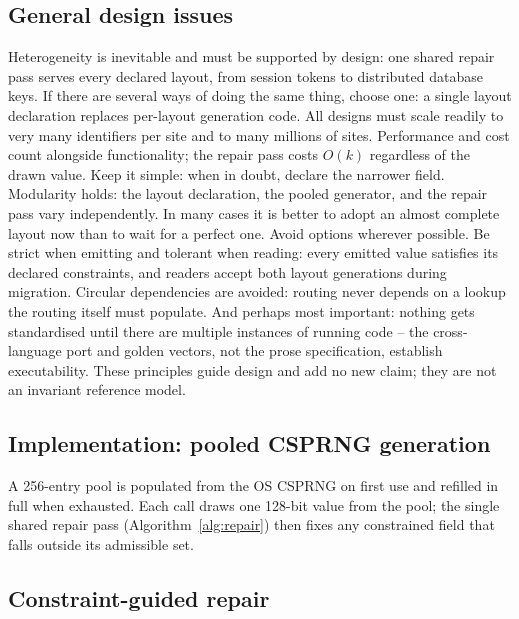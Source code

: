 \documentclass{svproc}
\begin{document}
\subsection{General design issues}
\label{sec:principles}
Heterogeneity is inevitable and must be supported by design: one shared repair pass serves every declared layout, from session tokens to distributed database keys. If there are several ways of doing the same thing, choose one: a single layout declaration replaces per-layout generation code. All designs must scale readily to very many identifiers per site and to many millions of sites. Performance and cost count alongside functionality; the repair pass costs $O(k)$ regardless of the drawn value. Keep it simple: when in doubt, declare the narrower field. Modularity holds: the layout declaration, the pooled generator, and the repair pass vary independently. In many cases it is better to adopt an almost complete layout now than to wait for a perfect one. Avoid options wherever possible. Be strict when emitting and tolerant when reading: every emitted value satisfies its declared constraints, and readers accept both layout generations during migration. Circular dependencies are avoided: routing never depends on a lookup the routing itself must populate. And perhaps most important: nothing gets standardised until there are multiple instances of running code -- the cross-language port and golden vectors, not the prose specification, establish executability. These principles guide design and add no new claim; they are not an invariant reference model.

\subsection{Implementation: pooled CSPRNG generation}
\label{sec:pooled-gen}
A 256-entry pool is populated from the OS CSPRNG on first use and
refilled in full when exhausted. Each call draws one 128-bit value from
the pool; the single shared repair pass
(Algorithm~\ref{alg:repair}) then fixes any constrained field that falls
outside its admissible set.

\subsection{Constraint-guided repair}
\label{sec:repair}
\end{document}
